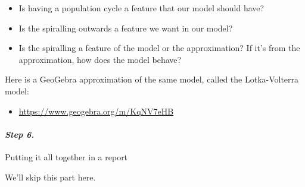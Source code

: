 \begin{example}
\begin{itemize}
	\item Is having a population cycle a feature that our model should have?
	\item Is the spiralling outwards a feature we want in our model?
	\item Is the spiralling a feature of the model or the approximation? If it's from the approximation, how does the model behave?
\end{itemize}

\end{example}

\begin{graybox}
Here is a GeoGebra approximation of the same model, called the Lotka-Volterra model:
\begin{itemize}
	\item \url{https://www.geogebra.org/m/KqNV7eHB} \hfill {}
\end{itemize}
\end{graybox}


\paragraph{\emph{Step 6.}} Putting it all together in a report

We'll skip this part here.




